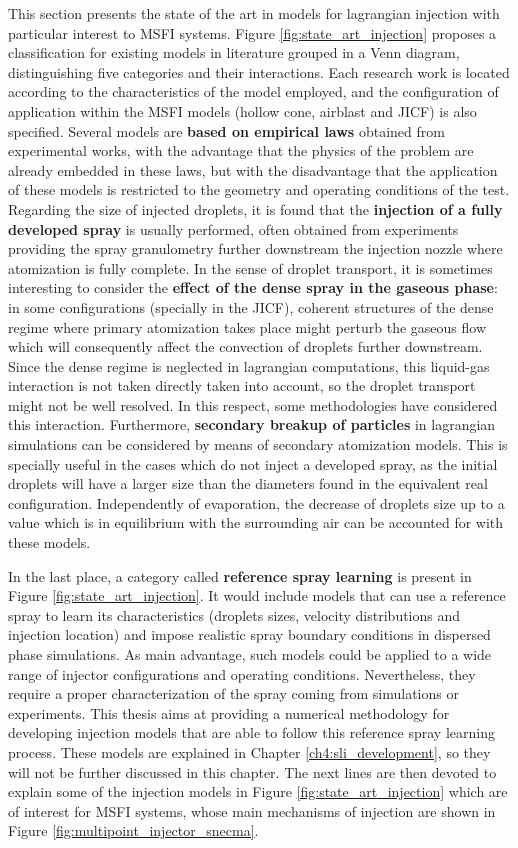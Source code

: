 This section presents the state of the art in models for lagrangian injection with particular interest to MSFI systems. Figure \ref{fig:state_art_injection} proposes a classification for existing models in literature grouped in a Venn diagram, distinguishing five categories and their interactions. Each research work is located according to the characteristics of the model employed, and the configuration of application within the MSFI models (hollow cone, airblast and JICF) is also specified. Several models are \textbf{based on empirical laws} obtained from experimental works, with the advantage that the physics of the problem are already embedded in these laws, but with the disadvantage that the application of these models is restricted to the geometry and operating conditions of the test. Regarding the size of injected droplets, it is found that the \textbf{injection of a fully developed spray} is usually performed, often obtained from experiments providing the spray granulometry further downstream the injection nozzle where atomization is fully complete. In the sense of droplet transport, it is sometimes interesting to consider the \textbf{effect of the dense spray in the gaseous phase}: in some configurations (specially in the JICF), coherent structures of the dense regime where primary atomization takes place might perturb the gaseous flow which will consequently affect the convection of droplets further downstream. Since the dense regime is neglected in lagrangian computations, this liquid-gas interaction is not taken directly taken into account, so the droplet transport might not be well resolved. In this respect, some methodologies have considered this interaction. Furthermore,  \textbf{secondary breakup of particles} in lagrangian simulations can be considered by means of secondary atomization models. This is specially useful in the cases which do not inject a developed spray, as the initial droplets will have a larger size than the diameters found in the equivalent real configuration. Independently of evaporation, the decrease of droplets size up to a value which is in equilibrium with the surrounding air can be accounted for with these models.

In the last place, a category called \textbf{reference spray learning} is present in Figure \ref{fig:state_art_injection}. It would include models that can use a reference spray to learn its characteristics (droplets sizes, velocity distributions and injection location) and impose realistic spray boundary conditions in dispersed phase simulations. As main advantage, such models could be applied to a wide range of injector configurations and operating conditions. Nevertheless, they require a proper characterization of the spray coming from simulations or experiments. This thesis aims at providing a numerical methodology for developing injection models that are able to follow this reference spray learning process. These models are explained in Chapter \ref{ch4:sli_development}, so they will not be further discussed in this chapter. The next lines are then devoted to explain some of the injection models in Figure \ref{fig:state_art_injection} which are of interest for MSFI systems, whose main mechanisms of injection are shown in Figure \ref{fig:multipoint_injector_snecma}.

